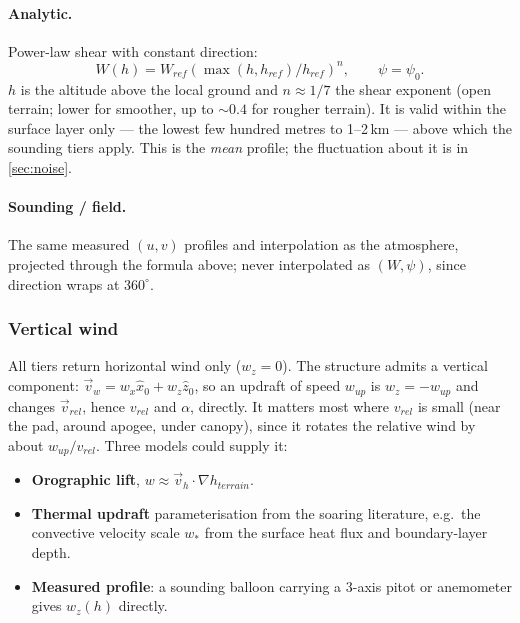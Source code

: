 \paragraph{Analytic.} Power-law shear with constant direction:
\begin{equation} \label{eq:wind_shear}
    W(h) = W_{ref}\left(\max(h,h_{ref})/h_{ref}\right)^{n}, \qquad \psi = \psi_0.
\end{equation}
$h$ is the altitude above the local ground and $n\approx1/7$ the shear exponent (open terrain;
lower for smoother, up to $\sim0.4$ for rougher terrain). It is valid within the surface layer only
--- the lowest few hundred metres to 1--2\,km --- above which the sounding tiers apply. This is the
\emph{mean} profile; the fluctuation about it is in \autoref{sec:noise}.

\paragraph{Sounding / field.} The same measured $(u,v)$ profiles and interpolation as the
atmosphere, projected through the formula above; never interpolated as $(W,\psi)$, since direction
wraps at $360^\circ$.

\subsubsection{Vertical wind}\label{sec:vertical_wind}
All tiers return horizontal wind only ($w_z=0$). The structure admits a vertical component:
$\vec{v}_w=w_x\hat{x}_0+w_z\hat{z}_0$, so an updraft of speed $w_{up}$ is $w_z=-w_{up}$ and changes
$\vec{v}_{rel}$, hence $v_{rel}$ and $\alpha$, directly. It matters most where $v_{rel}$ is small
(near the pad, around apogee, under canopy), since it rotates the relative wind by about
$w_{up}/v_{rel}$. Three models could supply it:
\begin{itemize}
    \item \textbf{Orographic lift}, $w\approx\vec{v}_h\cdot\nabla h_{terrain}$.
    \item \textbf{Thermal updraft} parameterisation from the soaring literature, e.g.\ the
    convective velocity scale $w_*$ from the surface heat flux and boundary-layer depth.
    \item \textbf{Measured profile}: a sounding balloon carrying a 3-axis pitot or anemometer gives
    $w_z(h)$ directly.
\end{itemize}


